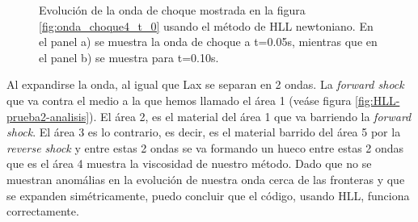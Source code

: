 \documentclass[12pt,a4paper]{book}
\begin{document}
\begin{figure}
\caption{\label{fig:HLL-prueba2}Evolución de la onda de choque mostrada en la figura \ref{fig:onda_choque4_t_0} usando el método de HLL newtoniano. En el panel a) se muestra la onda de choque a t=0.05s, mientras que en el panel b) se muestra para t=0.10s.}  
\end{figure}

Al expandirse la onda, al igual que Lax se separan en 2 ondas. La \emph{forward shock} que va contra el medio a la que hemos llamado el área 1 (veáse figura \ref{fig:HLL-prueba2-analisis}). El área 2, es el material del área 1 que va barriendo la \emph{forward shock}. El área 3 es lo contrario, es decir, es el material barrido del área 5 por la \emph{reverse shock} y entre estas 2 ondas se va formando un hueco entre estas 2 ondas que es el área 4 muestra la viscosidad de nuestro método. Dado  que no se muestran anomálias en la evolución de nuestra onda cerca de las fronteras y que se expanden simétricamente, puedo concluir que el código, usando HLL, funciona correctamente.
\end{document}
